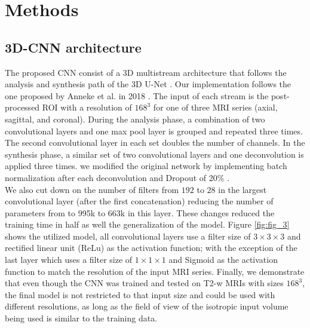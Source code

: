 \section{Methods}
\label{sec:methods}




\subsection{3D-CNN architecture}
The proposed CNN consist of a 3D multistream architecture that follows the analysis and synthesis path of the 3D U-Net \cite{cciccek20163d}. Our implementation follows the one proposed by Anneke et al. in 2018  \cite{anneke}. The input of each stream is the post-processed ROI with a resolution of $168^3$ for one of three MRI series (axial, sagittal, and coronal). During the analysis phase, a combination of two convolutional layers and one max pool layer is grouped and repeated three times. The second convolutional layer in each set doubles the number of channels.  In the synthesis phase, a similar set of two convolutional layers and one deconvolution is applied three times. we modified the original network by implementing batch normalization \cite{ioffe2015batch} after each deconvolution and Dropout of 20\% \cite{hinton2012improving}.\\
We also cut down on the number of filters from $192$ to $28$ in the largest convolutional layer (after the first concatenation) reducing the number of parameters from to 995k to 663k in this layer. These changes reduced the training time in half as well the generalization of the  model. Figure \ref{fig:fig_3} shows the utilized model, all convolutional layers use a filter size of $3 \times 3 \times 3$ and rectified linear unit (ReLu) as the activation function; with the exception of the last layer which uses a filter size of $1 \times 1 \times 1$ and Sigmoid as the activation function to match the resolution of the input MRI series.
Finally, we demonstrate that even though the CNN was trained and tested on T2-w MRIs with sizes $168^3$, the final model is not restricted to that input size and could be used with different resolutions, as long as the field of view of the isotropic input volume being used is similar to the training data. 

